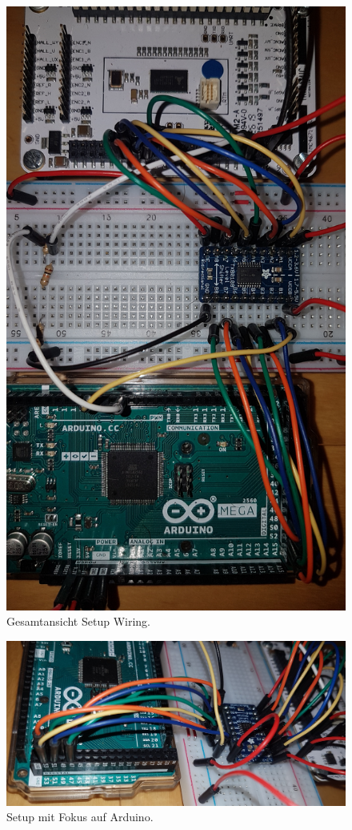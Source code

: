 \begin{figure}[H]
	\centering
	\includegraphics[angle=180,width=\textwidth]{graphics/2_komplett2}
	\caption{Gesamtansicht Setup Wiring.}
	\label{fig:1_komplett}
\end{figure}

\begin{figure}[H]
	\centering
	\includegraphics[angle = 270,width=\textwidth]{graphics/2_Arduino}
	\caption{Setup mit Fokus auf Arduino.}
	\label{fig:2_Arduino}
\end{figure}

